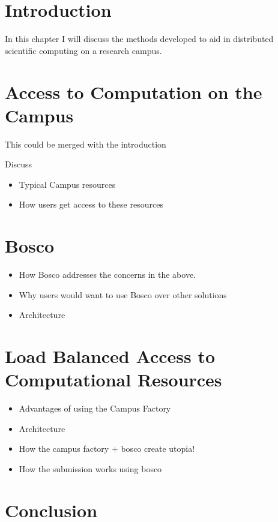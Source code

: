 \section{Introduction}

In this chapter I will discuss the methods developed to aid in distributed scientific computing on a research campus.  

\section{Access to Computation on the Campus}

This could be merged with the introduction

Discuss
\begin{itemize}
\item Typical Campus resources
\item How users get access to these resources
\end{itemize}

\section{Bosco}

\begin{itemize}
\item How Bosco addresses the concerns in the above.
\item Why users would want to use Bosco over other solutions
\item Architecture
\end{itemize}

\section{Load Balanced Access to Computational Resources}

\begin{itemize}
\item Advantages of using the Campus Factory
\item Architecture
\item How the campus factory + bosco create utopia!
\item How the submission works using bosco
\end{itemize}





\section{Conclusion}



